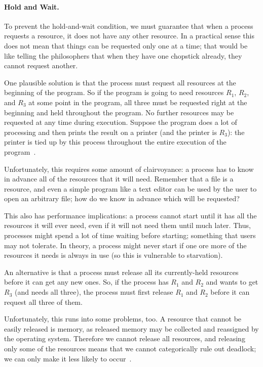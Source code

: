 \paragraph{Hold and Wait.} To prevent the hold-and-wait condition, we must guarantee that when a process requests a resource, it does not have any other resource. In a practical sense this does not mean that things can be requested only one at a time; that would be like telling the philosophers that when they have one chopstick already, they cannot request another.

One plausible solution is that the process must request all resources at the beginning of the program. So if the program is going to need resources $R_{1}$, $R_{2}$, and $R_{3}$ at some point in the program, all three must be requested right at the beginning and held throughout the program. No further resources may be requested at any time during execution. Suppose the program does a lot of processing and then prints the result on a printer (and the printer is $R_{3}$): the printer is tied up by this process throughout the entire execution of the program~\cite{osc}.

Unfortunately, this requires some amount of clairvoyance: a process has to know in advance all of the resources that it will need. Remember that a file is a resource, and even a simple program like a text editor can be used by the user to open an arbitrary file; how do we know in advance which will be requested?

This also has performance implications: a process cannot start until it has all the resources it will ever need, even if it will not need them until much later. Thus, processes might spend a lot of time waiting before starting; something that users may not tolerate. In theory, a process might never start if one ore more of the resources it needs is always in use (so this is vulnerable to starvation).

An alternative is that a process must release all its currently-held resources before it can get any new ones. So, if the process has $R_{1}$ and $R_{2}$ and wants to get $R_{3}$ (and needs all three), the process must first release $R_{1}$ and $R_{2}$ before it can request all three of them. 

Unfortunately, this runs into some problems, too. A resource that cannot be easily released is memory, as released memory may be collected and reassigned by the operating system. Therefore we cannot release all resources, and releasing only some of the resources means that we cannot categorically rule out deadlock; we can only make it less likely to occur~\cite{mte241}.

